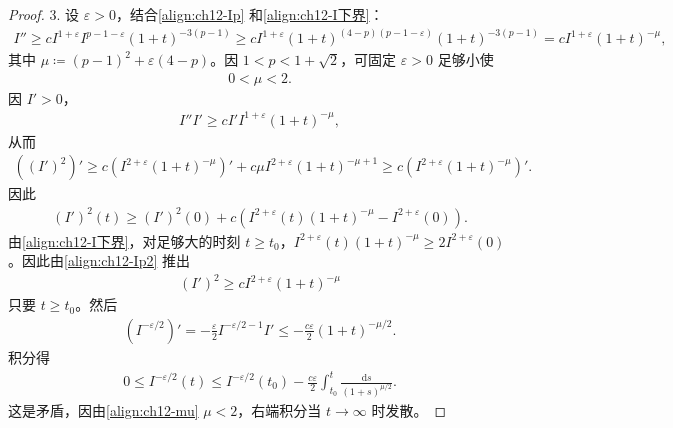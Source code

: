 \documentclass[../../main.tex]{subfiles}
\begin{document}
\begin{proof}
3. 设 $\varepsilon>0$，结合\eqref{align:ch12-Ip} 和\eqref{align:ch12-I下界}：
\begin{align*}
I''\geqslant cI^{1+\varepsilon}I^{p-1-\varepsilon}(1+t)^{-3(p-1)}\geqslant cI^{1+\varepsilon}(1+t)^{(4-p)(p-1-\varepsilon)}(1+t)^{-3(p-1)}=cI^{1+\varepsilon}(1+t)^{-\mu},
\end{align*}
其中 $\mu\coloneqq(p-1)^2+\varepsilon(4-p)$。因 $1<p<1+\sqrt{2}$，可固定 $\varepsilon>0$ 足够小使
\begin{align}
0<\mu<2.
\label{align:ch12-mu}
\end{align}
因 $I'>0$，
\begin{align*}
I''I'\geqslant cI'I^{1+\varepsilon}(1+t)^{-\mu},
\end{align*}
从而
\begin{align*}
((I')^2)'\geqslant c(I^{2+\varepsilon}(1+t)^{-\mu})'+c\mu I^{2+\varepsilon}(1+t)^{-\mu+1}\geqslant c(I^{2+\varepsilon}(1+t)^{-\mu})'.
\end{align*}
因此
\begin{align}
(I')^2(t)\geqslant(I')^2(0)+c(I^{2+\varepsilon}(t)(1+t)^{-\mu}-I^{2+\varepsilon}(0)).
\label{align:ch12-Ip2}
\end{align}
由\eqref{align:ch12-I下界}，对足够大的时刻 $t\geqslant t_0$，$I^{2+\varepsilon}(t)(1+t)^{-\mu}\geqslant 2I^{2+\varepsilon}(0)$。因此由\eqref{align:ch12-Ip2} 推出
\begin{align*}
(I')^2\geqslant cI^{2+\varepsilon}(1+t)^{-\mu}
\end{align*}
只要 $t\geqslant t_0$。然后
\begin{align*}
(I^{-\varepsilon/2})'=-\frac{\varepsilon}{2}I^{-\varepsilon/2-1}I'\leqslant-\frac{c\varepsilon}{2}(1+t)^{-\mu/2}.
\end{align*}
积分得
\begin{align*}
0\leqslant I^{-\varepsilon/2}(t)\leqslant I^{-\varepsilon/2}(t_0)-\frac{c\varepsilon}{2}\int_{t_0}^t\frac{\mathrm{d}s}{(1+s)^{\mu/2}}.
\end{align*}
这是矛盾，因由\eqref{align:ch12-mu} $\mu<2$，右端积分当 $t\to\infty$ 时发散。
\end{proof}
\end{document}
